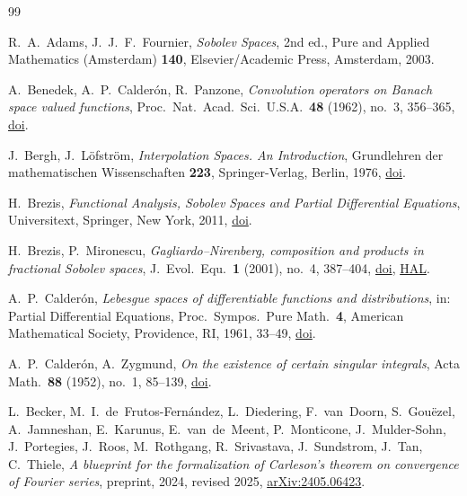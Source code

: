 \bpbibheading
\begin{thebibliography}{99}

R.~A.~Adams, J.~J.~F.~Fournier,
\emph{Sobolev Spaces}, 2nd ed.,
Pure and Applied Mathematics (Amsterdam) \textbf{140}, Elsevier/Academic Press, Amsterdam, 2003.

A.~Benedek, A.~P.~Calder\'on, R.~Panzone,
\emph{Convolution operators on Banach space valued functions},
Proc.\ Nat.\ Acad.\ Sci.\ U.S.A.\ \textbf{48} (1962), no.~3, 356--365,
\href{https://doi.org/10.1073/pnas.48.3.356}{doi}.

J.~Bergh, J.~L\"ofstr\"om,
\emph{Interpolation Spaces. An Introduction},
Grundlehren der mathematischen Wissenschaften \textbf{223}, Springer-Verlag, Berlin, 1976,
\href{https://doi.org/10.1007/978-3-642-66451-9}{doi}.

H.~Brezis,
\emph{Functional Analysis, Sobolev Spaces and Partial Differential Equations},
Universitext, Springer, New York, 2011,
\href{https://doi.org/10.1007/978-0-387-70914-7}{doi}.

H.~Brezis, P.~Mironescu,
\emph{Gagliardo--Nirenberg, composition and products in fractional Sobolev spaces},
J.\ Evol.\ Equ.\ \textbf{1} (2001), no.~4, 387--404,
\href{https://doi.org/10.1007/PL00001378}{doi},
\href{https://hal.archives-ouvertes.fr/hal-00747694}{HAL}.

A.~P.~Calder\'on,
\emph{Lebesgue spaces of differentiable functions and distributions},
in: Partial Differential Equations, Proc.\ Sympos.\ Pure Math.\ \textbf{4},
American Mathematical Society, Providence, RI, 1961, 33--49,
\href{https://doi.org/10.1090/pspum/004/0143037}{doi}.

A.~P.~Calder\'on, A.~Zygmund,
\emph{On the existence of certain singular integrals},
Acta Math.\ \textbf{88} (1952), no.~1, 85--139,
\href{https://doi.org/10.1007/BF02392130}{doi}.

L.~Becker, M.~I.~de~Frutos-Fern\'andez, L.~Diedering, F.~van~Doorn, S.~Gou\"ezel,
A.~Jamneshan, E.~Karunus, E.~van~de~Meent, P.~Monticone, J.~Mulder-Sohn, J.~Portegies,
J.~Roos, M.~Rothgang, R.~Srivastava, J.~Sundstrom, J.~Tan, C.~Thiele,
\emph{A blueprint for the formalization of Carleson's theorem on convergence of Fourier
series}, preprint, 2024, revised 2025,
\href{https://arxiv.org/abs/2405.06423}{arXiv:2405.06423}.


\end{thebibliography}
